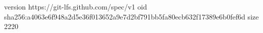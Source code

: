 version https://git-lfs.github.com/spec/v1
oid sha256:a4063e6f948a2d5e36f013652a9e7d2bf791bb5fa80ecb632f17389e6b0fef6d
size 2220
